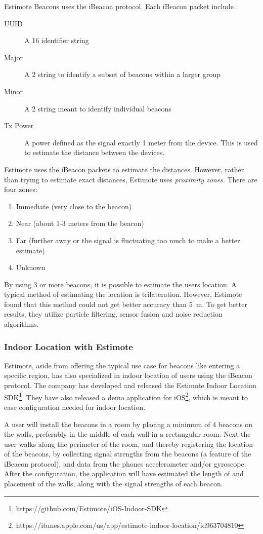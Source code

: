 Estimote Beacons uses the iBeacon protocol. 
Each iBeacon packet include \cite{IBEACON}:
\begin{description}
  \item[UUID] A \SI{16}{\byte} identifier string 
  \item[Major] A \SI{2}{\byte} string to identify a subset of beacons within a larger group
  \item[Minor] A \SI{2}{\byte} string meant to identify individual beacons
  \item[Tx Power] A power defined as the signal exactly 1 meter from the device. This is used to estimate the distance between the devices. 
\end{description}

Estimote uses the iBeacon packets to estimate the distances. 
However, rather than trying to estimate exact distances, 
Estimote uses \emph{proximity zones}. 
There are four zones:
\begin{enumerate}
  \item Immediate (very close to the beacon)
  \item Near (about 1-3 meters from the beacon)
  \item Far (further away or the signal is fluctuating too much to make a better estimate)
  \item Unknown 
\end{enumerate}

By using \num{3} or more beacons, it is possible to estimate the users location. 
A typical method of estimating the location is trilateration. 
However, Estimote found that this method could not get better accuracy than \SI{5}{\meter}.
To get better results, 
they utilize particle filtering, sensor fusion and noise reduction algorithms.

\subsubsection{Indoor Location with Estimote}
Estimote, aside from offering the typical use case for beacons like entering a specific region, 
has also specialized in indoor location of users using the iBeacon protocol. 
The company has developed and released the Estimote Indoor Location SDK\footnote{https://github.com/Estimote/iOS-Indoor-SDK}.
They have also released a demo application for iOS\footnote{https://itunes.apple.com/us/app/estimote-indoor-location/id963704810}, 
which is meant to ease configuration needed for indoor location. 

A user will install the beacons in a room by placing a minimum of \num{4} beacons on the walls, 
preferably in the middle of each wall in a rectangular room.   
Next the user walks along the perimeter of the room, 
and thereby registering the location of the beacons, 
by collecting signal strengths from the beacons (a feature of the iBeacon protocol), 
and data from the phones accelerometer and/or gyroscope.
After the configuration, the application will have estimated the length of and placement of the walls, 
along with the signal strengths of each beacon.

